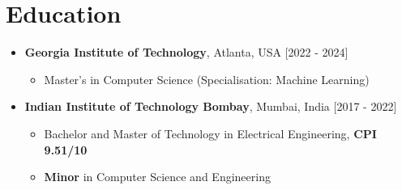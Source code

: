 \documentclass[10pt,letterpaper,sans]{moderncv}
\begin{document}
\renewcommand{\labelitemi}{$\bullet$}
\makecvtitle
\section{Education}

\begin{itemize}
\item \textbf{Georgia Institute of Technology}, Atlanta, USA \hfill{[2022 - 2024]}
\begin{itemize}
    \item Master's in Computer Science (Specialisation: Machine Learning)
\end{itemize}
\vspace{10pt}
\item \textbf{Indian Institute of Technology Bombay}, Mumbai, India \hfill{[2017 - 2022]}
\begin{itemize}
    \item Bachelor and Master of Technology in Electrical Engineering, \textbf{CPI 9.51/10}
    \item \textbf{Minor} in Computer Science and Engineering
\end{itemize}
\end{itemize}
\vspace{-10pt}
\end{document}
